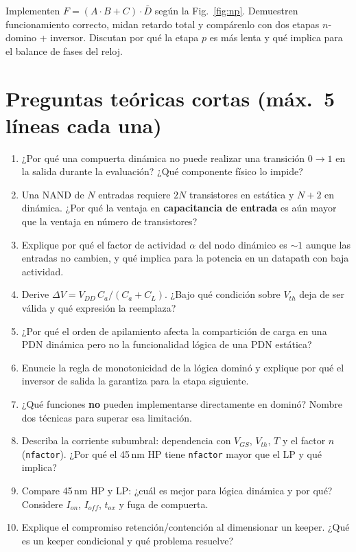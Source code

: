 \documentclass[11pt,a4paper]{article}
\begin{document}
Implementen $F=(A\cdot B+C)\cdot\bar D$ según la Fig.~\ref{fig:np}. Demuestren funcionamiento correcto, midan retardo total y compárenlo con dos etapas $n$-domino + inversor. Discutan por qué la etapa $p$ es más lenta y qué implica para el balance de fases del reloj.

\section{Preguntas teóricas cortas (máx.\ 5 líneas cada una)}
\begin{enumerate}[nosep,leftmargin=*]
\item ¿Por qué una compuerta dinámica no puede realizar una transición $0\to1$ en la salida durante la evaluación? ¿Qué componente físico lo impide?
\item Una NAND de $N$ entradas requiere $2N$ transistores en estática y $N+2$ en dinámica. ¿Por qué la ventaja en \textbf{capacitancia de entrada} es aún mayor que la ventaja en número de transistores?
\item Explique por qué el factor de actividad $\alpha$ del nodo dinámico es $\sim1$ aunque las entradas no cambien, y qué implica para la potencia en un datapath con baja actividad.
\item Derive $\Delta V=V_{DD}\,C_a/(C_a+C_L)$. ¿Bajo qué condición sobre $V_{th}$ deja de ser válida y qué expresión la reemplaza?
\item ¿Por qué el orden de apilamiento afecta la compartición de carga en una PDN dinámica pero no la funcionalidad lógica de una PDN estática?
\item Enuncie la regla de monotonicidad de la lógica dominó y explique por qué el inversor de salida la garantiza para la etapa siguiente.
\item ¿Qué funciones \textbf{no} pueden implementarse directamente en dominó? Nombre dos técnicas para superar esa limitación.
\item Describa la corriente subumbral: dependencia con $V_{GS}$, $V_{th}$, $T$ y el factor $n$ (\texttt{nfactor}). ¿Por qué el 45\,nm HP tiene \texttt{nfactor} mayor que el LP y qué implica?
\item Compare 45\,nm HP y LP: ¿cuál es mejor para lógica dinámica y por qué? Considere $I_{on}$, $I_{off}$, $t_{ox}$ y fuga de compuerta.
\item Explique el compromiso retención/contención al dimensionar un keeper. ¿Qué es un keeper condicional y qué problema resuelve?

\end{enumerate}
\end{document}
